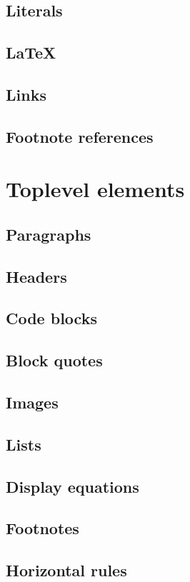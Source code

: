     \subsection{Literals}
    \subsection{\LaTeX}
    \subsection{Links}
    \subsection{Footnote references}
    \section{Toplevel elements}
    \subsection{Paragraphs}
    \subsection{Headers}
    \subsection{Code blocks}
    \subsection{Block quotes}
    \subsection{Images}
    \subsection{Lists}
    \subsection{Display equations}
    \subsection{Footnotes}
    \subsection{Horizontal rules}
